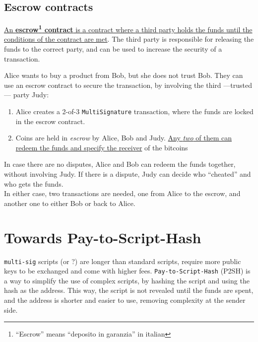 \subsection{Escrow contracts}
\ul{An \textbf{escrow\footnote{``Escrow'' means ``deposito in garanzia'' in italian} contract} is a contract where a third party holds the funds until the conditions of the contract are met}. The third party is responsible for releasing the funds to the correct party, and can be used to increase the security of a transaction.

Alice wants to buy a product from Bob, but she does not trust Bob. They can use an escrow contract to secure the transaction, by involving the third ---trusted--- party Judy:
\begin{enumerate}
   \item Alice creates a 2-of-3 \texttt{MultiSignature} transaction, where the funds are locked in the escrow contract.
   \item Coins are held in \textit{escrow} by Alice, Bob and Judy. \ul{Any \textit{two} of them can redeem the funds and specify the receiver} of the bitcoins
\end{enumerate}
In case there are no disputes, Alice and Bob can redeem the funds together, without involving Judy. If there is a dispute, Judy can decide who ``cheated'' and who gets the funds.\\
In either case, two transactions are needed, one from Alice to the escrow, and another one to either Bob or back to Alice.

\section{Towards Pay-to-Script-Hash}

\texttt{multi-sig} scripts (or ?) are longer than standard scripts, require more public keys to be exchanged and come with higher fees.
\texttt{Pay-to-Script-Hash} (P2SH) is a way to simplify the use of complex scripts, by hashing the script and using the hash as the address. This way, the script is not revealed until the funds are spent, and the address is shorter and easier to use, removing complexity at the sender side.

